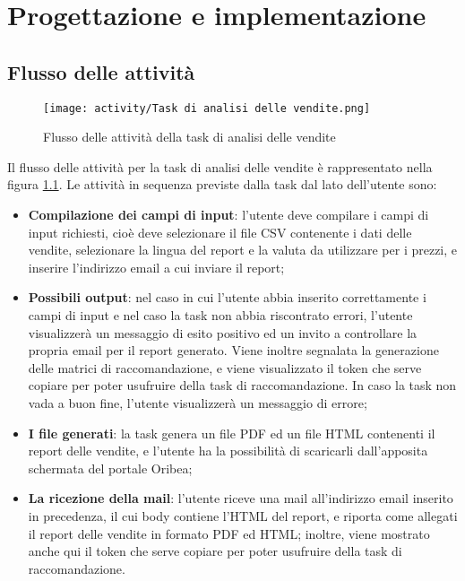 \chapter{Progettazione e implementazione}
\label{cap:progettazione-implementazione}


\section{Flusso delle attività}

\begin{figure}[!h]
    \centering 
    \texttt{[image: activity/Task di analisi delle vendite.png]}
    \caption{Flusso delle attività della task di analisi delle vendite}
    \label{fig:activity-sales-analysis}
\end{figure}

Il flusso delle attività per la task di analisi delle vendite è rappresentato nella figura \ref{fig:activity-sales-analysis}. Le attività in sequenza previste dalla task dal lato dell'utente sono:
\begin{itemize}
    \item \textbf{Compilazione dei campi di input}: l'utente deve compilare i campi di input richiesti, cioè deve selezionare il file CSV contenente i dati delle vendite, selezionare la lingua del report e la valuta da utilizzare per i prezzi, e inserire l'indirizzo email a cui inviare il report;
    \item \textbf{Possibili output}: nel caso in cui l'utente abbia inserito correttamente i campi di input e nel caso la task non abbia riscontrato errori, l'utente visualizzerà un messaggio di esito positivo ed un invito a controllare la propria email per il report generato. Viene inoltre segnalata la generazione delle matrici di raccomandazione, e viene visualizzato il token che serve copiare per poter usufruire della task di raccomandazione. In caso la task non vada a buon fine, l'utente visualizzerà un messaggio di errore;
    \item \textbf{I file generati}: la task genera un file PDF ed un file HTML contenenti il report delle vendite, e l'utente ha la possibilità di scaricarli dall'apposita schermata del portale Oribea;
    \item \textbf{La ricezione della mail}: l'utente riceve una mail all'indirizzo email inserito in precedenza, il cui body contiene l'HTML del report, e riporta come allegati il report delle vendite in formato PDF ed HTML; inoltre, viene mostrato anche qui il token che serve copiare per poter usufruire della task di raccomandazione.
\end{itemize}

